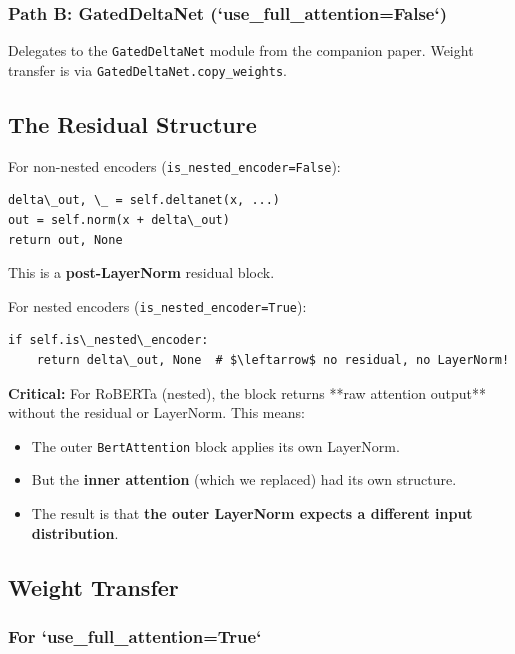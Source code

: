 \subsubsection{Path B: GatedDeltaNet (`use\_full\_attention=False`)}

Delegates to the \texttt{GatedDeltaNet} module from the companion paper. Weight 
transfer is via \texttt{GatedDeltaNet.copy\_weights}.

\subsection{The Residual Structure}

For non-nested encoders (\texttt{is\_nested\_encoder=False}):

\begin{lstlisting}
delta\_out, \_ = self.deltanet(x, ...)
out = self.norm(x + delta\_out)
return out, None
\end{lstlisting}

This is a \textbf{post-LayerNorm} residual block.

For nested encoders (\texttt{is\_nested\_encoder=True}):

\begin{lstlisting}
if self.is\_nested\_encoder:
    return delta\_out, None  # $\leftarrow$ no residual, no LayerNorm!
\end{lstlisting}

\textbf{Critical:} For RoBERTa (nested), the block returns **raw attention 
output** without the residual or LayerNorm. This means:
\begin{itemize}
\item The outer \texttt{BertAttention} block applies its own LayerNorm.
\item But the \textbf{inner attention} (which we replaced) had its own structure.
\item The result is that \textbf{the outer LayerNorm expects a different input distribution}.

\end{itemize}
\subsection{Weight Transfer}

\subsubsection{For `use\_full\_attention=True`}

